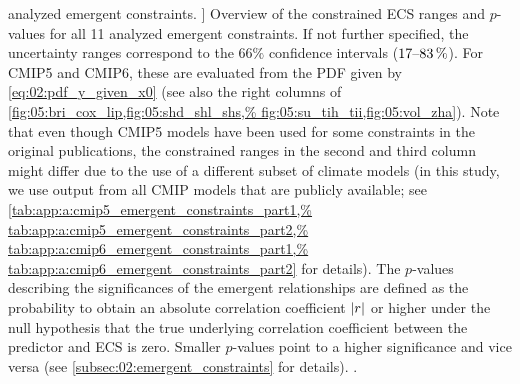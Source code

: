\begin{table}[!b]
    analyzed emergent constraints.
  ]{
    Overview of the constrained \acf{ECS} ranges and $p$-values for all 11
    analyzed emergent constraints. If not further specified, the uncertainty
    ranges correspond to the $66 \unit{\%}$ confidence intervals
    ($\rangeunit{17}{83}{\%}$). For \acs{CMIP}5 and \acs{CMIP}6, these are
    evaluated from the \acl{PDF} given by \cref{eq:02:pdf_y_given_x0} (see also
    the right columns of \cref{fig:05:bri_cox_lip,fig:05:shd_shl_shs,%
      fig:05:su_tih_tii,fig:05:vol_zha}). Note that even though \acs{CMIP}5
    models have been used for some constraints in the original publications,
    the constrained ranges in the second and third column might differ due to
    the use of a different subset of climate models (in this study, we use
    output from all \acs{CMIP} models that are publicly available; see
    \cref{tab:app:a:cmip5_emergent_constraints_part1,%
      tab:app:a:cmip5_emergent_constraints_part2,%
      tab:app:a:cmip6_emergent_constraints_part1,%
      tab:app:a:cmip6_emergent_constraints_part2} for details). The $p$-values
    describing the significances of the emergent relationships are defined as
    the probability to obtain an absolute correlation coefficient $\abs*{r}$
    or higher under the null hypothesis that the true underlying correlation
    coefficient between the predictor and \acs{ECS} is zero. Smaller
    $p$-values point to a higher significance and vice versa (see
    \cref{subsec:02:emergent_constraints} for details).
    .
  }
  \label{tab:05:overview_results}
\end{table}

